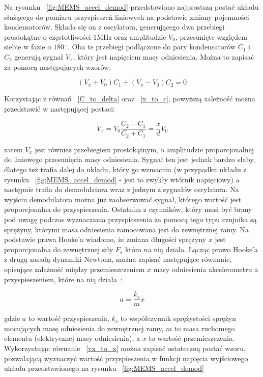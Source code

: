 Na rysunku ~\ref{fig:MEMS_accel_demod} przedstawiono najprostszą postać układu służącego do pomiaru przyspieszeń liniowych na podstawie zmiany pojemności kondensatorów. Składa się on z oscylatora, generującego dwa przebiegi prostokątne o częstotliwości 1MHz oraz amplitudzie $V_0$, przesunięte względem siebie w fazie o $180\,^{\circ}$. Oba te przebiegi podłączone do pary kondensatorów $C_1$ i $C_2$ generują sygnał $V_x$, który jest napięciem masy odniesienia. Można to zapisać za pomocą następujących wzorów:

\begin{equation}
	(V_x + V_0)C_1 + (V_x - V_0)C_2 = 0
\end{equation}  

Korzystając z równań ~\ref{C_to_delta} oraz ~\ref{x_to_c}, powyższą zależność można przedstawić w następującej postaci:

\begin{equation}
V_x = V_0\frac{C_2 - C_1}{C_2 + C_1} = \frac{x}{d}V_0
\label{vx_to_x}
\end{equation}

zatem $V_x$ jest również przebiegiem prostokątnym, o amplitudzie proporcjonalnej do liniowego przesunięcia masy odniesienia. Sygnał ten jest jednak bardzo słaby, dlatego też trafia dalej do układu, który go wzmacnia (w przypadku układu z rysunku ~\ref{fig:MEMS_accel_demod} -  jest to zwykły wtórnik napięciowy) a następnie trafia do demodulatora wraz z jednym z sygnałów oscylatora. Na wyjściu demodulatora można już zaobserwować sygnał, którego wartość jest proporcjonalna do przyspieszenia. Ostatnim z czynników, który musi być brany pod uwagę podczas wyznaczania przyspieszenia za pomocą tego typu czujnika są sprężyny, którymi masa odniesienia zamocowana jest do zewnętrznej ramy. Na podstawie prawa Hooke'a wiadomo, że zmiana długości sprężyny $x$ jest proporcjonalna do zewnętrznej siły $F_s$ która na nią działa. Łącząc prawo Hooke'a z drugą zasadą dynamiki Newtona, można zapisać następujące równanie, opisujące zależność między przemieszczeniem $x$ masy odniesienia akcelerometru a przyspieszeniem, które na nią działa~\cite{mems12}:

\begin{equation}
	a = \frac{k_s}{m}x
\end{equation}  

gdzie $a$ to wartość przyspieszenia, $k_s$ to współczynnik sprężystości sprężyn mocujących masę odniesienia do zewnętrznej ramy, $m$ to masa ruchomego elementu (elektrycznej masy odniesienia), a $x$ to wartość przemieszczenia. Wykorzystując równanie ~\ref{vx_to_x} można zapisać ostateczną postać wzoru, pozwalającą wyznaczyć wartość przyspieszenia w funkcji napięcia wyjściowego układu przedstawionego na rysunku ~\ref{fig:MEMS_accel_demod}

